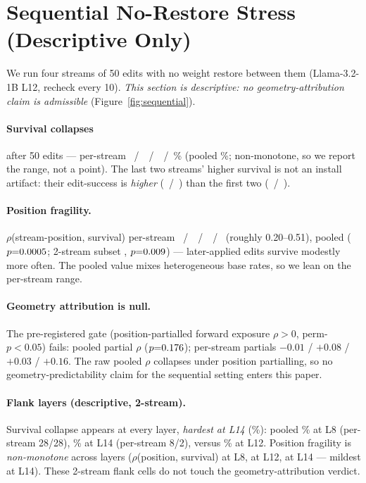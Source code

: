 \section{Sequential No-Restore Stress (Descriptive Only)}
\label{sec:sequential}

We run four streams of 50 edits with no weight restore between them
(Llama-3.2-1B L12, recheck every 10). \emph{This section is descriptive: no
geometry-attribution claim is admissible} (Figure~\ref{fig:sequential}).



\paragraph{Survival collapses} after 50 edits --- per-stream
\seqSurvA{}~/~\seqSurvB{}~/~\seqSurvC{}~/~\seqSurvD{}\% (pooled
\seqSurvPooled{}\%; non-monotone, so we report the range, not a point). The last
two streams' higher survival is not an install artifact: their edit-success is
\emph{higher} (\seqEsrC{}~/~\seqEsrD{}) than the first two
(\seqEsrA{}~/~\seqEsrB{}).

\paragraph{Position fragility.} $\rho$(stream-position, survival) per-stream
\seqPosA{}~/~\seqPosB{}~/~\seqPosC{}~/~\seqPosD{} (roughly 0.20--0.51), pooled
\seqPosPooled{} ($p{=}0.0005{}$; 2-stream subset \seqPosTwoStream{},
$p{=}0.009{}$) --- later-applied edits survive modestly more often.
The pooled value mixes heterogeneous base rates, so we lean on the per-stream
range.

\paragraph{Geometry attribution is null.} The pre-registered gate
(position-partialled forward \SxC{} exposure $\rho>0$, perm-$p<0.05$) fails:
pooled partial $\rho$ \seqHone{} ($p{=}0.176{}$); per-stream partials
$-0.01$ / $+0.08$ / $+0.03$ / $+0.16$. The raw pooled $\rho$ collapses under
position partialling, so no geometry-predictability claim for the sequential
setting enters this paper.

\paragraph{Flank layers (descriptive, 2-stream).} Survival collapse appears at
every layer, \emph{hardest at L14} (\seqLfourteenSurv{}\%): pooled
\seqLeightSurv{}\% at L8 (per-stream 28/28), \seqLfourteenSurv{}\% at L14
(per-stream 8/2), versus \seqSurvPooled{}\% at L12. Position fragility is
\emph{non-monotone} across layers ($\rho$(position, survival) \seqLeightPos{} at
L8, \seqPosPooled{} at L12, \seqLfourteenPos{} at L14 --- mildest at L14). These
2-stream flank cells do not touch the geometry-attribution verdict.
